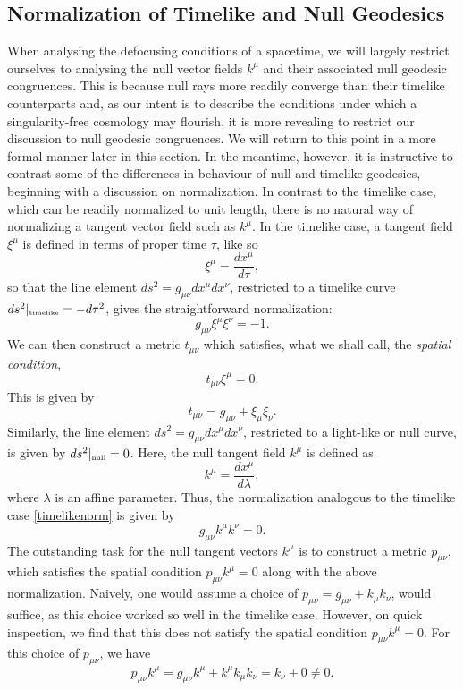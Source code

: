 \subsection{Normalization of Timelike and Null Geodesics} 
When analysing the defocusing conditions of a spacetime, we will largely restrict ourselves to analysing the null vector fields $k^{\mu}$ and their associated null geodesic congruences. This is because null rays more readily converge than their timelike counterparts and, as our intent is to describe the conditions under which a singularity-free cosmology may flourish, it is more revealing to restrict our discussion to null geodesic congruences. We will return to this point in a more formal manner later in this section. In the meantime, however, it is instructive to contrast some of the differences in behaviour of null and timelike geodesics, beginning with a discussion on normalization. In contrast to the timelike case, which can be readily normalized to unit length, there is no natural way of normalizing a tangent vector field such as $k^\mu$. In the timelike case, a tangent field $\xi^\mu$ is defined in terms of proper time $\tau$, like so
\[
\xi^\mu =\frac{dx^\mu}{d\tau}
,\]
so that the line element $ds^2=g_{\mu\nu}dx^\mu dx^\nu$, restricted to a timelike curve $ds^2\rvert_{\mbox{{\tiny timelike}}}=-d\tau^2$, gives the straightforward normalization:
\[
\label{timelikenorm}
g_{\mu\nu}\xi^\mu \xi^\nu=-1
.\]
We can then construct a  metric $t_{\mu\nu}$ which satisfies, what we shall call, the \emph{spatial condition},
\[
t_{\mu\nu}\xi^\mu=0.
\]
This is given by
\[
\label{timelikemetric}
t_{\mu\nu}=g_{\mu\nu}+\xi_\mu\xi_\nu.
\] 
Similarly, the line element $ds^2=g_{\mu\nu} dx^\mu dx^\nu$, restricted to a light-like or null curve, is given by $ds^2\rvert_{\mbox{{\tiny null}}}=0$. Here, the null tangent field $k^{\mu}$ is defined as
\[
k^\mu=\frac{dx^\mu}{d\lambda}
,\]
 where $\lambda$ is an affine parameter.
Thus, the normalization analogous to the timelike case \eqref{timelikenorm} is given by
  \[
  \label{nullnorm}
 g_{\mu\nu}k^\mu k^\nu=0
 .\]
The outstanding task for the null tangent vectors $k^\mu$ is to construct a metric $p_{\mu\nu}$, which satisfies the spatial condition $p_{\mu\nu}k^\mu=0$ along with the above normalization. Naively, one would assume a choice of $p_{\mu\nu}=g_{\mu\nu}+k_\mu k_\nu$, would suffice, as this choice worked so well in the timelike case. However, on quick inspection, we find that this does not satisfy the spatial condition $p_{\mu\nu}k^\mu=0$. For this choice of $p_{\mu\nu}$, we have
\[
p_{\mu\nu}k^\mu=g_{\mu\nu}k^\mu+k^\mu k_\mu k_\nu=k_\nu+0\neq 0.
\]
